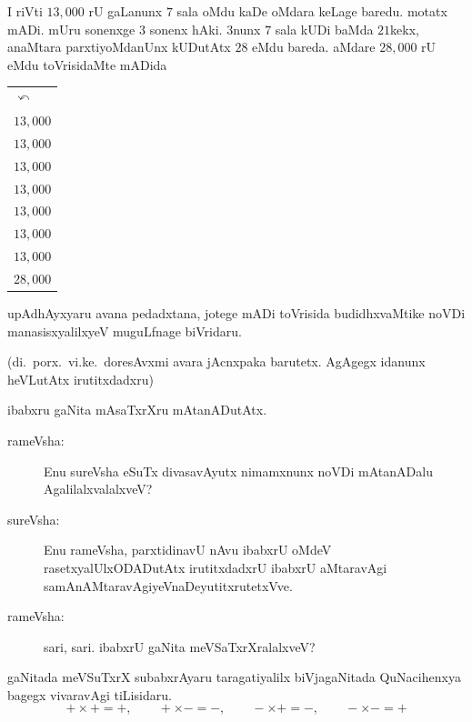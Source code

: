 \noindent
\begin{minipage}[c]{5.5cm}
\qquad I riVti $13,000$ rU gaLanunx $7$ sala oMdu kaDe oMdara keLage baredu. motatx mADi. mUru sonenxge $3$ sonenx hAki. $3$nunx $7$ sala kUDi baMda $21$kekx, anaMtara parxtiyoMdanUnx kUDutAtx $28$ eMdu bareda. aMdare $28,000$ rU eMdu toVrisidaMte mADida
\end{minipage}
\quad
\begin{minipage}[c]{4cm}
\begin{center}
\begin{tabular}{l}
$\curvearrowleft$\\
$13,000$\\
$13,000$\\
$13,000$\\
$13,000$\\
$13,000$\\
$13,000$\\
$13,000$\\
\hline
$28,000$
\end{tabular}
\end{center}
\end{minipage}

\smallskip

upAdhAyxyaru avana pedadxtana, jotege mADi toVrisida budidhxvaMtike noVDi manasisxyalilxyeV muguLfnage biVridaru.

(di.\ porx.\ vi.ke.\ doresAvxmi avara jAcnxpaka barutetx. AgAgegx idanunx heVLutAtx irutitxdadxru)

\medskip

ibabxru gaNita mAsaTxrXru mAtanADutAtx.
\begin{description}
\item[rameVsha:] Enu sureVsha eSuTx divasavAyutx nimamxnunx noVDi mAtanADalu AgalilalxvalalxveV?

\item[sureVsha:] Enu rameVsha, parxtidinavU nAvu ibabxrU oMdeV rasetxyalUlx\break ODADutAtx irutitxdadxrU ibabxrU aMtaravAgi samAnAMtaravAgiyeV\break naDeyutitxrutetxVve.

\item[rameVsha:] sari, sari. ibabxrU gaNita meVSaTxrXralalxveV?
\end{description}

\eject

gaNitada meVSuTxrX subabxrAyaru taragatiyalilx biVjagaNitada QuNacihenxya bagegx vivaravAgi tiLisidaru.
$$
+\times+=+,\qquad +\times-=-,\qquad -\times+=-,\qquad -\times -=+
$$

